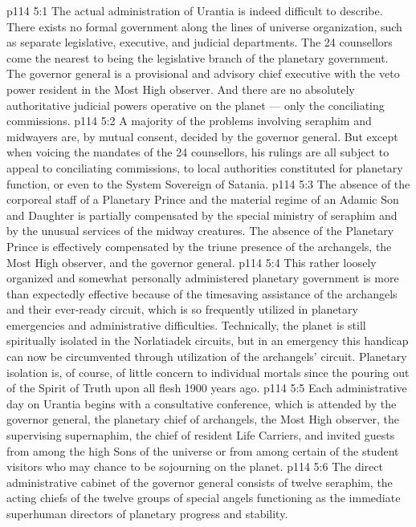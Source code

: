 \vs p114 5:1 The actual administration of Urantia is indeed difficult to describe. There exists no formal government along the lines of universe organization, such as separate legislative, executive, and judicial departments. The 24 counsellors come the nearest to being the legislative branch of the planetary government. The governor general is a provisional and advisory chief executive with the veto power resident in the Most High observer. And there are no absolutely authoritative judicial powers operative on the planet --- only the conciliating commissions.
\vs p114 5:2 A majority of the problems involving seraphim and midwayers are, by mutual consent, decided by the governor general. But except when voicing the mandates of the 24 counsellors, his rulings are all subject to appeal to conciliating commissions, to local authorities constituted for planetary function, or even to the System Sovereign of Satania.
\vs p114 5:3 The absence of the corporeal staff of a Planetary Prince and the material regime of an Adamic Son and Daughter is partially compensated by the special ministry of seraphim and by the unusual services of the midway creatures. The absence of the Planetary Prince is effectively compensated by the triune presence of the archangels, the Most High observer, and the governor general.
\vs p114 5:4 This rather loosely organized and somewhat personally administered planetary government is more than expectedly effective because of the timesaving assistance of the archangels and their ever\hyp{}ready circuit, which is so frequently utilized in planetary emergencies and administrative difficulties. Technically, the planet is still spiritually isolated in the Norlatiadek circuits, but in an emergency this handicap can now be circumvented through utilization of the archangels’ circuit. Planetary isolation is, of course, of little concern to individual mortals since the pouring out of the Spirit of Truth upon all flesh 1900 years ago.
\vs p114 5:5 \pc Each administrative day on Urantia begins with a consultative conference, which is attended by the governor general, the planetary chief of archangels, the Most High observer, the supervising supernaphim, the chief of resident Life Carriers, and invited guests from among the high Sons of the universe or from among certain of the student visitors who may chance to be sojourning on the planet.
\vs p114 5:6 The direct administrative cabinet of the governor general consists of twelve seraphim, the acting chiefs of the twelve groups of special angels functioning as the immediate superhuman directors of planetary progress and stability.
